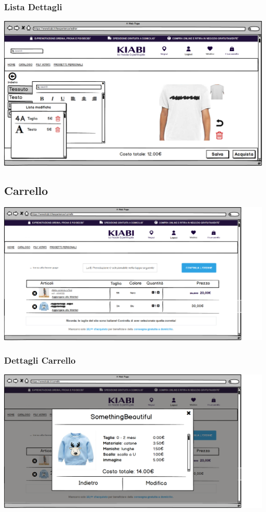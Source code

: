 \documentclass[12pt,italian,]{report}
\begin{document}
\subsubsection{Lista Dettagli} 
\includegraphics{balsamiq/Editor - caratteristica busto testo 4.png}
\subsection{Carrello} 
\includegraphics{balsamiq/Carrello.png}
\subsubsection{Dettagli Carrello} 
\includegraphics{balsamiq/Carrello dettagli.png}
\end{document}

